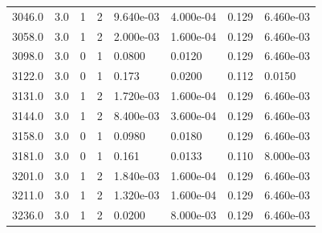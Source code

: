 \documentclass[preview]{standalone}
\begin{document}
{{{\begin{tabular}{L{1.2cm}C{1.2cm} C{0.3cm}C{0.5cm} C{1.4cm}C{1.4cm} C{1.4cm}C{1.4cm}}
  3046.0  &   3.0  & 1     &  2 &  9.640e-03  & 4.000e-04  & 0.129 &  6.460e-03   \\ 
  3058.0  &   3.0  & 1     &  2 &  2.000e-03  & 1.600e-04  & 0.129 &  6.460e-03   \\ 
  3098.0  &   3.0  & 0     &  1 &  0.0800  & 0.0120  & 0.129 &  6.460e-03   \\ 
  3122.0  &   3.0  & 0     &  1 &  0.173  & 0.0200  & 0.112 &  0.0150   \\ 
  3131.0  &   3.0  & 1     &  2 &  1.720e-03  & 1.600e-04  & 0.129 &  6.460e-03   \\ 
  3144.0  &   3.0  & 1     &  2 &  8.400e-03  & 3.600e-04  & 0.129 &  6.460e-03   \\ 
  3158.0  &   3.0  & 0     &  1 &  0.0980  & 0.0180  & 0.129 &  6.460e-03   \\ 
  3181.0  &   3.0  & 0     &  1 &  0.161  & 0.0133  & 0.110 &  8.000e-03   \\ 
  3201.0  &   3.0  & 1     &  2 &  1.840e-03  & 1.600e-04  & 0.129 &  6.460e-03   \\ 
  3211.0  &   3.0  & 1     &  2 &  1.320e-03  & 1.600e-04  & 0.129 &  6.460e-03   \\ 
  3236.0  &   3.0  & 1     &  2 &  0.0200  & 8.000e-03  & 0.129 &  6.460e-03   \\ 
\hline 
\end{tabular} 

}}}
\end{document}
